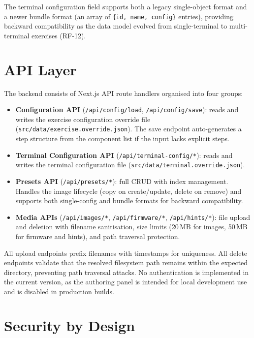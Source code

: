 The terminal configuration field supports both a legacy single-object format and a newer bundle format (an array of \texttt{\{id, name, config\}} entries), providing backward compatibility as the data model evolved from single-terminal to multi-terminal exercises (RF-12).

\section{API Layer}\label{sec:api}

The backend consists of Next.js API route handlers organised into four groups:

\begin{itemize}
    \item \textbf{Configuration API} (\texttt{/api/config/load}, \texttt{/api/config/save}): reads and writes the exercise configuration override file (\texttt{src/data/exercise.override.json}). The save endpoint auto-generates a step structure from the component list if the input lacks explicit steps.
    \item \textbf{Terminal Configuration API} (\texttt{/api/terminal-config/*}): reads and writes the terminal configuration file (\texttt{src/data/terminal.override.json}).
    \item \textbf{Presets API} (\texttt{/api/presets/*}): full CRUD with index management. Handles the image lifecycle (copy on create/update, delete on remove) and supports both single-config and bundle formats for backward compatibility.
    \item \textbf{Media APIs} (\texttt{/api/images/*}, \texttt{/api/firmware/*}, \texttt{/api/hints/*}): file upload and deletion with filename sanitisation, size limits (20\,MB for images, 50\,MB for firmware and hints), and path traversal protection.
\end{itemize}

All upload endpoints prefix filenames with timestamps for uniqueness. All delete endpoints validate that the resolved filesystem path remains within the expected directory, preventing path traversal attacks. No authentication is implemented in the current version, as the authoring panel is intended for local development use and is disabled in production builds.

\section{Security by Design}\label{sec:security}

